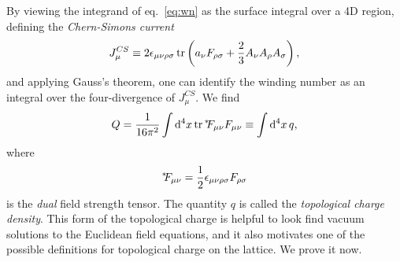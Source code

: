 By viewing the integrand of eq.~\eqref{eq:wn} 
as the surface integral over a 4D region, defining the 
{\it Chern-Simons current}
\begin{equation}
  J_\mu^{CS}\equiv 2\epsilon_{\mu\nu\rho\sigma}\tr
    \left(a_\nu F_{\rho\sigma} +\frac{2}{3}A_\nu A_\rho A_\sigma\right),
\end{equation}
and applying Gauss's theorem, one can identify the winding number as 
an integral over the four-divergence of $J_\mu^{CS}$. We find
\begin{equation}\label{eq:Q}
  Q=\frac{1}{16\pi^2}\int\dd[4]{x}\tr\dual{F_{\mu\nu}}F_{\mu\nu}
   \equiv \int\dd[4]{x}q,
\end{equation}
where
\begin{equation} 
{}^{*\hspace{-1mm}}{F}_{\mu\nu}=\frac{1}{2}\epsilon_{\mu\nu\rho\sigma}F_{\rho\sigma}
\end{equation}
is the {\it dual} field strength tensor. The quantity
$q$ is called the {\it topological charge density}. This form of the
topological charge is helpful to look find vacuum solutions to the
Euclidean field equations, and it also motivates one of the possible
definitions for topological charge on the lattice. We prove it now.
